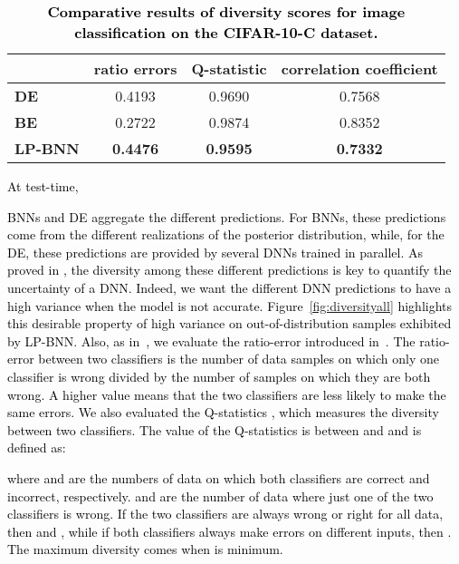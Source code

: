 \documentclass[10pt,twocolumn,letterpaper]{article}
\newcommand\emi{\textcolor{black}}
\newcommand\Gianni{\textcolor{black}}
\newcommand{\ab}[1]{\textcolor{black}{#1}}
\begin{document}
\begin{table}[t!]
\renewcommand{\figurename}{Table}
\renewcommand{\captionfont}{\small}
\begin{center}
\scalebox{0.75}
{
\begin{tabular}{l|c|c|c}
\toprule
 &   \textbf{ratio errors  }  & \textbf{Q-statistic  }   & \textbf{correlation coefficient  } \\  
\midrule
\textbf{DE}        &0.4193      & 0.9690    & 0.7568 \\ 
\midrule
\textbf{BE}         &0.2722     & 0.9874    & 0.8352  \\ 
 \midrule
\textbf{LP-BNN }      & \textbf{0.4476 }    & \textbf{0.9595}    & \textbf{0.7332}       \\ 
\bottomrule
\end{tabular}
}
\end{center}
\caption{\Gianni{\textbf{Comparative results of diversity \ab{scores} for image classification 
\ab{on the CIFAR-10-C dataset}.}} 
}\label{table:diversity_c}
\vspace{-3pt}
\end{table}

\ab{At test-time, }
\Gianni{
BNNs and DE aggregate the different predictions. For BNNs, these predictions come from the different  realizations of the posterior distribution, while, for the DE, these predictions \emi{are provided by} several DNNs trained in parallel.
As proved in \cite{fort2019deep,rame2021dice}, the diversity \emi{among} these different predictions is 
key to quantify the uncertainty of a DNN. Indeed, we want the different DNN predictions to have a high variance when the 
\ab{model} is not accurate. 
\emi{Figure~\ref{fig:diversityall} highlights this desirable property of high variance on out-of-distribution samples exhibited by LP-BNN.} Also, as in~\cite{rame2021dice}, we evaluate the ratio-error introduced in~\cite{aksela2003comparison}. The ratio-error between two classifiers is the  number of data \ab{samples} on which 
\ab{only} one classifier is wrong divided by the number of 
\ab{samples} on \emi{which} they are both wrong. A higher value means that the two classifiers are less likely to make the same errors. 
We also evaluated the Q-statistics \cite{aksela2003comparison}, which measures the diversity between two classifiers. The value of the Q-statistics \emi{is} between \ab{ and } and is defined 
\ab{as:}

where  and  are the numbers of data \emi{on which} both classifiers are correct and incorrect\emi{, respectively}.   and   are the number of data where just one of the two classifier\emi{s} is wrong. 
If the two classifiers are always wrong or right for all data\emi{, then}  and , \emi{while} if both classifiers always make errors on different inputs, then . The maximum diversity comes when  is minimum.} 
\end{document}
